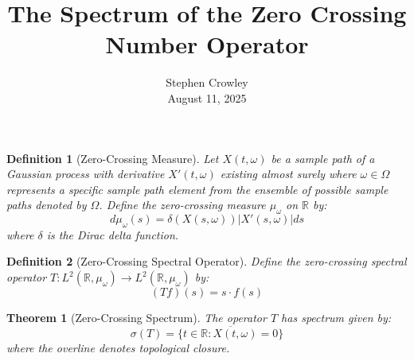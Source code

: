 \documentclass{article}
\newcommand{\tmaffiliation}[1]{\\ #1}
\newtheorem{definition}{Definition}
\newtheorem{theorem}{Theorem}
\begin{document}
\title{The Spectrum of the Zero Crossing Number Operator}

\author{
  Stephen Crowley
  \tmaffiliation{August 11, 2025}
}

\maketitle

\begin{definition}
  [Zero-Crossing Measure] Let $X (t, \omega)$ be a sample path of a Gaussian
  process with derivative $X' (t, \omega)$ existing almost surely where
  $\omega \in \Omega$ represents a specific sample path element from the
  ensemble of possible sample paths denoted by $\Omega$. Define the
  zero-crossing measure $\mu_{\omega}$ on $\mathbb{R}$ by:
  \begin{equation}
    d \mu_{\omega} (s) = \delta (X (s, \omega)) |X' (s, \omega) | ds
  \end{equation}
  where $\delta$ is the Dirac delta function.
\end{definition}

\begin{definition}
  [Zero-Crossing Spectral Operator] Define the zero-crossing spectral operator
  $T : L^2 (\mathbb{R}, \mu_{\omega}) \to L^2 (\mathbb{R}, \mu_{\omega})$ by:
  \begin{equation}
    (Tf) (s) = s \cdot f (s)
  \end{equation}
\end{definition}

\begin{theorem}
  [Zero-Crossing Spectrum] The operator $T$ has spectrum given by:
  \begin{equation}
    \sigma (T) = \overline{\{t \in \mathbb{R}: X (t, \omega) = 0\}}
  \end{equation}
  where the overline denotes topological closure.
\end{theorem}
\end{document}
